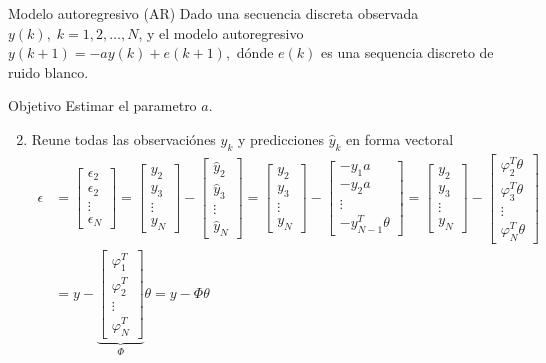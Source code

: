 \documentclass[presentation,aspectratio=169]{beamer}
\begin{document}
\begin{frame}[label={sec:orgc04acfd}]{Modelo autoregresivo (AR)}
Dado una secuencia discreta observada \(y(k), \; k=1,2,\ldots,N\), y el modelo autoregresivo
\(y(k+1) = -ay(k) + e(k+1),\)
dónde \(e(k)\) es una sequencia discreto de ruido blanco.

\alert{Objetivo} Estimar el parametro \(a\).

\begin{enumerate}
\setcounter{enumi}{1}
\item Reune todas las observaciónes \(y_k\) y predicciones \(\hat{y}_k\) en forma vectoral
\begin{align*}
\epsilon &= \begin{bmatrix} \epsilon_2\\\epsilon_2\\\vdots\\\epsilon_N\end{bmatrix} =  \begin{bmatrix} y_2\\ y_3\\\vdots\\y_N \end{bmatrix} - \begin{bmatrix} \hat{y}_2\\ \hat{y}_3\\\vdots\\\hat{y}_N \end{bmatrix}
 =  \begin{bmatrix} y_2\\ y_3\\\vdots\\y_N \end{bmatrix} - \begin{bmatrix} -y_1 a\\ -y_2 a\\\vdots\\-y_{N-1}^T\theta \end{bmatrix} =  \begin{bmatrix} y_2\\ y_3\\\vdots\\y_N \end{bmatrix} - \begin{bmatrix} \varphi_2^T\theta\\ \varphi_3^T\theta\\\vdots\\\varphi_N^T\theta \end{bmatrix}\\
&= y - \underbrace{\begin{bmatrix}\varphi_1^T\\\varphi_2^T\\\vdots\\\varphi_N^T\end{bmatrix}}_{\Phi}\theta = y - \Phi\theta 
\end{align*}
\end{enumerate}
\end{frame}
\end{document}
